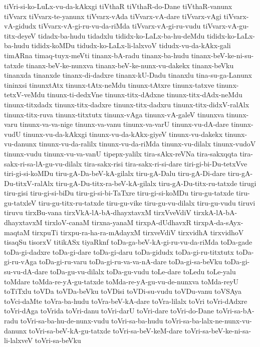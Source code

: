 {tiVri-si-ko-LuLx-vu-da-kAkxgi
tiVthaR
tiVthaR-do-Dane
tiVthaR-vanunx
tiVvarx
tiVvarx-te-yanunx
tiVvarx-vAda
tiVvarx-vA-dare
tiVvarx-vAgi
tiVvarx-vA-gidudx
tiVvarx-vA-gi-ru-vu-da-riMda
tiVvarx-vA-gi-ru-vudu
tiVvarx-vA-gu-titx-deyeV
tidadx-ba-hudu
tidadxlu
tididx-ko-LaLx-ba-hu-deMdu
tididx-ko-LaLx-ba-hudu
tididx-koMDu
tidudx-ko-LaLx-li-lalxvoV
tidudx-vu-da-kAkx-gali
timARna
timaq-tuyx-meVti
tinanx-bA-radu
tinanx-ba-hudu
tinanx-beV-ke-ni-su-tatxde
tinanx-beV-ke-nunxva
tinanx-beV-ke-nunx-vu-dakekx
tinanx-beVku
tinanxda
tinanxde
tinanx-di-dadxre
tinanx-kU-Dadu
tinanxlu
tina-su-ga-Lanunx
tininxsi
tinunxtAtx
tinunx-tAtx-neMdu
tinunx-tAtxre
tinunx-tatxve
tinunx-tetxV-veMdu
tinunx-ti-dedxVne
tinunx-titx-dAdxne
tinunx-titx-dAdx-neMdu
tinunx-titxdadx
tinunx-titx-dadxre
tinunx-titx-dadxru
tinunx-titx-didxV-ralAlx
tinunx-titx-ruva
tinunx-titxtutx
tinunx-vAga
tinunx-vA-galeV
tinunxva
tinunx-varu
tinunx-va-va-nige
tinunx-va-vanu
tinunx-va-varU
tinunx-vu-dA-dare
tinunx-vudU
tinunx-vu-da-kAkxgi
tinunx-vu-da-kAkx-giyeV
tinunx-vu-dakekx
tinunx-vu-danunx
tinunx-vu-da-ralilx
tinunx-vu-da-riMda
tinunx-vu-dilalx
tinunx-vudoV
tinunx-vudu
tinunx-vu-va-vanU
tipepx-yalilx
tira-sAkx-reVNa
tira-sakxqqta
tira-sakx-ri-sa-lA-gu-vu-dilalx
tira-sakx-risi
tira-sakx-ri-si-dare
tiri-gi-bi-Du-tetxVve
tiri-gi-si-koMDu
tiru-gA-Da-beV-kA-gilalx
tiru-gA-Dalu
tiru-gA-Di-dare
tiru-gA-Du-titxV-ralAlx
tiru-gA-Du-titx-ra-beV-kA-gilalx
tiru-gA-Du-titx-ru-tatxde
tirugi
tiru-gisi
tiru-gi-si-biDu
tiru-gi-si-bi-TaTxre
tiru-gi-si-koMDu
tiru-gu-tatxde
tiru-gu-tatxleV
tiru-gu-titx-ru-tatxde
tiru-gu-vike
tiru-gu-vu-dilalx
tiru-gu-vudu
tiruvi
tiruvu
tirxBu-vana
tirxVkA-lA-bA-dhayxtavxM
tirxVveVdiV
tirxkA-lA-bA-dhayxtavxM
tirxloV-canaM
tirxna-yanaM
tirxpA-dUdhavxR
tirxpA-da-sAyx-maqtaM
tirxpuTi
tirxpu-ra-ha-ra-mAdayxM
tirxveVdiV
tirxvidhA
tirxvidhoV
tisaqSu
tisorxV
titikASx
tiyaRknf
toDa-ga-beV-kA-gi-ru-vu-da-riMda
toDa-gade
toDa-gi-dadxre
toDa-gi-dare
toDa-gi-daru
toDa-gidudx
toDa-gi-ru-titxtutx
toDa-gi-ru-vAga
toDa-gi-ru-varu
toDa-gi-ru-va-va-nA-dare
toDa-gi-sa-beVku
toDa-gi-su-vu-dA-dare
toDa-gu-vu-dilalx
toDa-gu-vudu
toLe-dare
toLedu
toLe-yalu
toMdare
toMda-re-yA-gu-tatxde
toMda-re-yA-gu-vu-de-nunxva
toMda-reyU
toTiTxlu
toVDa
toVDa-beVku
toVDisi
toVDi-su-vudu
toVDu-vanu
toVSAya
toVci-daMte
toVra-ba-hudu
toVra-beV-kA-dare
toVra-lilalx
toVri
toVri-dAdxre
toVri-dAga
toVrida
toVri-danu
toVri-darU
toVri-dare
toVri-do-Dane
toVri-sa-bA-radu
toVri-sa-ba-hu-de-nunx-vudu
toVri-sa-ba-hudu
toVri-sa-ba-lalx-ne-nunx-vu-danunx
toVri-sa-beV-kA-gu-tatxde
toVri-sa-beV-keM-dare
toVri-sa-beV-ke-ni-sa-li-lalxveV
toVri-sa-beVku
}
